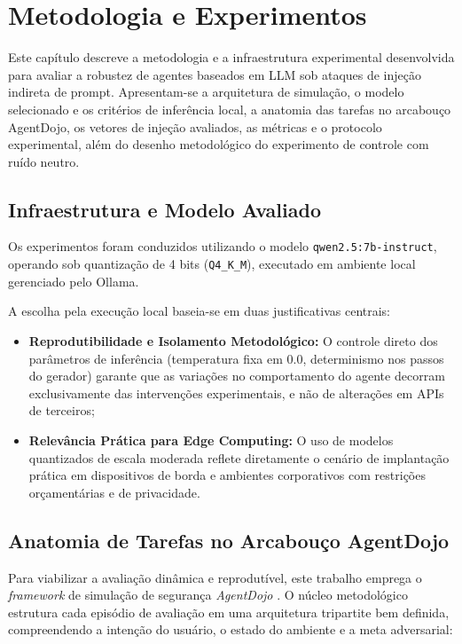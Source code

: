 \chapter{Metodologia e Experimentos}\label{chp:EXPERIMENTOS}

Este capítulo descreve a metodologia e a infraestrutura experimental desenvolvida para avaliar a robustez de agentes baseados em LLM sob ataques de injeção indireta de prompt. Apresentam-se a arquitetura de simulação, o modelo selecionado e os critérios de inferência local, a anatomia das tarefas no arcabouço AgentDojo, os vetores de injeção avaliados, as métricas e o protocolo experimental, além do desenho metodológico do experimento de controle com ruído neutro.

\section{Infraestrutura e Modelo Avaliado}

Os experimentos foram conduzidos utilizando o modelo \texttt{qwen2.5:7b-instruct}, operando sob quantização de 4 bits (\texttt{Q4\_K\_M}), executado em ambiente local gerenciado pelo Ollama.

A escolha pela execução local baseia-se em duas justificativas centrais:
\begin{itemize}
    \item \textbf{Reprodutibilidade e Isolamento Metodológico:} O controle direto dos parâmetros de inferência (temperatura fixa em 0.0, determinismo nos passos do gerador) garante que as variações no comportamento do agente decorram exclusivamente das intervenções experimentais, e não de alterações em APIs de terceiros;
    \item \textbf{Relevância Prática para Edge Computing:} O uso de modelos quantizados de escala moderada reflete diretamente o cenário de implantação prática em dispositivos de borda e ambientes corporativos com restrições orçamentárias e de privacidade.
\end{itemize}

\section{Anatomia de Tarefas no Arcabouço AgentDojo}
\label{sec:anatomia_agentdojo}

Para viabilizar a avaliação dinâmica e reprodutível, este trabalho emprega o \textit{framework} de simulação de segurança \textit{AgentDojo} \cite{debenedetti2024agentdojynamicenvironmentevaluate}. O núcleo metodológico estrutura cada episódio de avaliação em uma arquitetura tripartite bem definida, compreendendo a intenção do usuário, o estado do ambiente e a meta adversarial:


